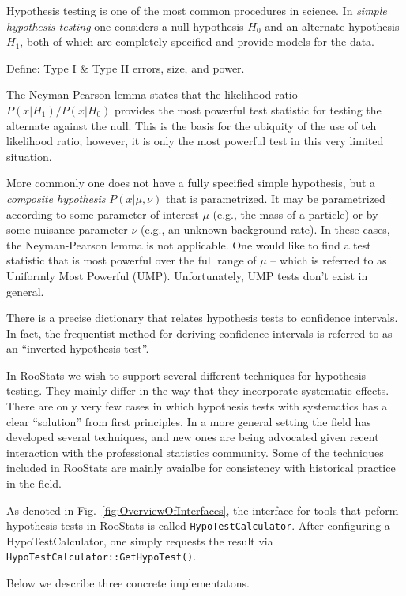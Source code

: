 \documentclass[11pt]{article}
\begin{document}
Hypothesis testing is one of the most common procedures in science.  In \textit{simple hypothesis testing} one considers a null hypothesis $H_0$ and an alternate hypothesis $H_1$, both of which are completely specified and provide models for the data.  

Define: Type I \& Type II errors, size, and power.

The Neyman-Pearson lemma states that the likelihood ratio $P(x|H_1)/P(x|H_0)$ provides the most powerful test statistic for testing the alternate against the null.  This is the basis for the ubiquity of the use of teh likelihood ratio; however, it is only the most powerful test in this very limited situation.

More commonly one does not have a fully specified simple hypothesis, but a \textit{composite hypothesis} $P(x|\mu,\nu)$ that is parametrized.  It may be parametrized according to some parameter of interest $\mu$ (e.g., the mass of a particle) or by some nuisance parameter $\nu$ (e.g., an unknown background rate).  In these cases, the Neyman-Pearson lemma is not applicable.  One would like to find a test statistic that is most powerful over the full range of $\mu$ -- which is referred to as Uniformly Most Powerful (UMP).  Unfortunately, UMP tests don't exist in general.  

There is a precise dictionary that relates hypothesis tests to confidence intervals.  In fact, the frequentist method for deriving confidence intervals is referred to as an ``inverted hypothesis test''.

In RooStats we wish to support several different techniques for hypothesis testing.  They mainly differ in the way that they incorporate systematic effects.  There are only very few cases in which hypothesis tests with systematics has a clear ``solution'' from first principles.  In a more general setting the field has developed several techniques, and new ones are being advocated given recent interaction with the professional statistics community.  Some of the techniques included in RooStats are mainly avaialbe for consistency with historical practice in the field.

As denoted in Fig.~\ref{fig:OverviewOfInterfaces}, the interface for tools that peform hypothesis tests in RooStats is called \texttt{HypoTestCalculator}.  After configuring a HypoTestCalculator, one simply requests the result via \texttt{HypoTestCalculator::GetHypoTest()}.

Below we describe three concrete implementatons.
\end{document}
